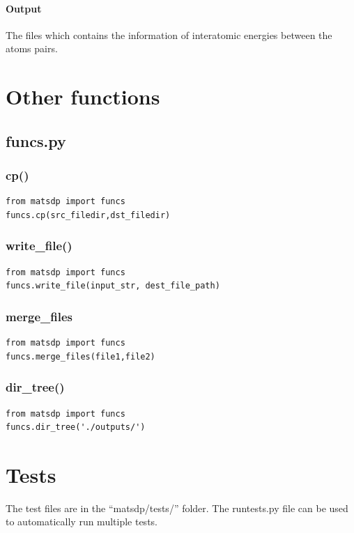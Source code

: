 \documentclass[12pt]{book}
\begin{document}
\subsubsection{Output}

The files which contains the information of interatomic energies between the atoms pairs.

\chapter{Other functions}
\section{funcs.py}

\subsection{cp()}

\begin{lstlisting}
from matsdp import funcs
funcs.cp(src_filedir,dst_filedir)
\end{lstlisting}

\subsection{write\_file()}

\begin{lstlisting}
from matsdp import funcs
funcs.write_file(input_str, dest_file_path)
\end{lstlisting}

\subsection{merge\_files}
\begin{lstlisting}
from matsdp import funcs
funcs.merge_files(file1,file2)
\end{lstlisting}

\subsection{dir\_tree()}

\begin{lstlisting}
from matsdp import funcs
funcs.dir_tree('./outputs/')
\end{lstlisting}

\chapter{Tests}
The test files are in the ``matsdp/tests/'' folder. The runtests.py file can be used to automatically run multiple tests.
\end{document}
